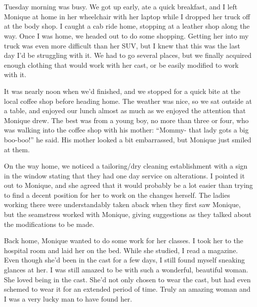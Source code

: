 \chapter{}
Tuesday morning was busy. We got up early, ate a quick breakfast, and I left Monique at
home in her wheelchair with her laptop while I dropped her truck off at the body shop. I caught
a cab ride home, stopping at a leather shop along the way. Once I was home, we headed out to do
some shopping. Getting her into my truck was even more difficult than her SUV, but I knew that
this was the last day I'd be struggling with it. We had to go several places, but we finally
acquired enough clothing that would work with her cast, or be easily modified to work with it.

It was nearly noon when we'd finished, and we stopped for a quick bite at the local coffee
shop before heading home. The weather was nice, so we sat outside at a table, and enjoyed our
lunch almost as much as we enjoyed the attention that Monique drew. The best was from a young
boy, no more than three or four, who was walking into the coffee shop with his mother: ``Mommy-
that lady gots a big boo-boo!'' he said. His mother looked a bit embarrassed, but Monique just
smiled at them.

On the way home, we noticed a tailoring/dry cleaning establishment with a sign in the window
stating that they had one day service on alterations. I pointed it out to Monique, and she
agreed that it would probably be a lot easier than trying to find a decent position for her to
work on the changes herself. The ladies working there were understandably taken aback when they
first saw Monique, but the seamstress worked with Monique, giving suggestions as they talked
about the modifications to be made.

Back home, Monique wanted to do some work for her classes. I took her to the hospital room
and laid her on the bed. While she studied, I read a magazine. Even though she'd been in the
cast for a few days, I still found myself sneaking glances at her. I was still amazed to be with
such a wonderful, beautiful woman. She loved being in the cast. She'd not only chosen to wear
the cast, but had even schemed to wear it for an extended period of time. Truly an amazing woman
and I was a very lucky man to have found her.

